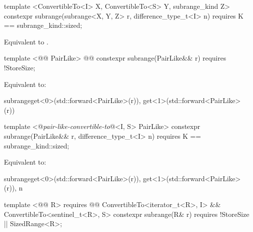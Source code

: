 %
\begin{itemdecl}
template <ConvertibleTo<I> X, ConvertibleTo<S> Y, subrange_kind Z>
constexpr subrange(subrange<X, Y, Z> r, difference_type_t<I> n)
  requires K == subrange_kind::sized;
\end{itemdecl}

\begin{itemdescr}
\pnum
\effects Equivalent to .
\end{itemdescr}

%
\begin{itemdecl}
template <@@ PairLike>
  @@
constexpr subrange(PairLike&& r) requires !StoreSize;
\end{itemdecl}

\begin{itemdescr}
\pnum
\effects Equivalent to:
\begin{codeblock}
subrange{get<0>(std::forward<PairLike>(r)), get<1>(std::forward<PairLike>(r))}
\end{codeblock}
\end{itemdescr}

%
\begin{itemdecl}
template <@\textit{pair-like-convertible-to}@<I, S> PairLike>
constexpr subrange(PairLike&& r, difference_type_t<I> n)
  requires K == subrange_kind::sized;
\end{itemdecl}

\begin{itemdescr}
\pnum
\effects Equivalent to:
\begin{codeblock}
subrange{get<0>(std::forward<PairLike>(r)), get<1>(std::forward<PairLike>(r)), n}
\end{codeblock}
\end{itemdescr}

%
\begin{itemdecl}
template <@@ R>
  requires @@ ConvertibleTo<iterator_t<R>, I> && ConvertibleTo<sentinel_t<R>, S>
constexpr subrange(R& r) requires !StoreSize || SizedRange<R>;
\end{itemdecl}

